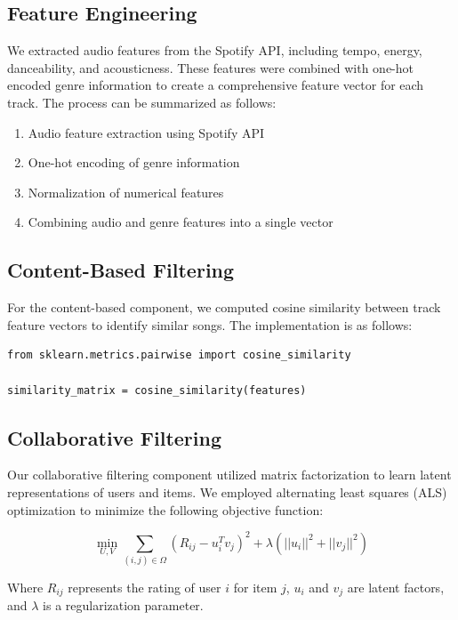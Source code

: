 \documentclass[runningheads]{llncs}
\begin{document}
\subsection{Feature Engineering}

We extracted audio features from the Spotify API, including tempo, energy, danceability, and acousticness. These features were combined with one-hot encoded genre information to create a comprehensive feature vector for each track. The process can be summarized as follows:

\begin{enumerate}
    \item Audio feature extraction using Spotify API
    \item One-hot encoding of genre information
    \item Normalization of numerical features
    \item Combining audio and genre features into a single vector
\end{enumerate}

\subsection{Content-Based Filtering}

For the content-based component, we computed cosine similarity between track feature vectors to identify similar songs. The implementation is as follows:

\begin{verbatim}
from sklearn.metrics.pairwise import cosine_similarity

similarity_matrix = cosine_similarity(features)
\end{verbatim}

\subsection{Collaborative Filtering}

Our collaborative filtering component utilized matrix factorization to learn latent representations of users and items. We employed alternating least squares (ALS) optimization to minimize the following objective function:

\[
\min_{U,V} \sum_{(i,j) \in \Omega} (R_{ij} - u_i^T v_j)^2 + \lambda(||u_i||^2 + ||v_j||^2)
\]

Where $R_{ij}$ represents the rating of user $i$ for item $j$, $u_i$ and $v_j$ are latent factors, and $\lambda$ is a regularization parameter.
\end{document}
